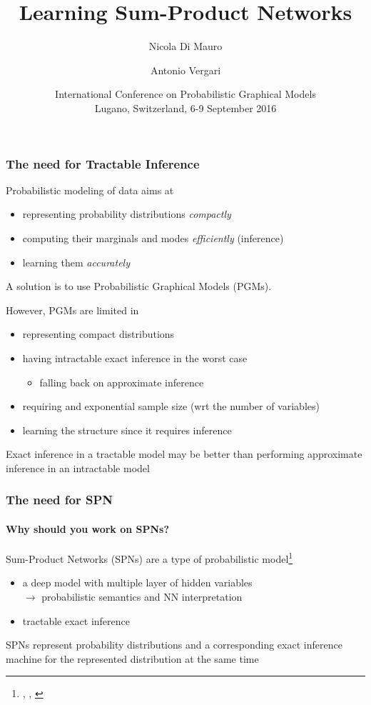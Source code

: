 \documentclass[10pt, t, xcolor={usenames,dvipsnames,svgnames}, compress]{beamer}
\title{Learning Sum-Product Networks}
\author{\small Nicola Di Mauro \and Antonio Vergari}
\date{\scriptsize International Conference on Probabilistic Graphical Models\\
 Lugano, Switzerland, 6-9 September 2016}
\institute{\scriptsize Università degli Studi di Bari}
\newcommand{\customcite}[1]{\footnote{\scriptsize \citeauthor{#1}, \citetitle{#1}, \citeyear{#1}}}
\begin{document}
\begin{frame}[c]
  \titlepage
\end{frame}

\begin{frame}
\frametitle{The need for Tractable Inference}

Probabilistic modeling of data aims at
\begin{itemize}
  \item representing probability distributions \emph{compactly}
  \item computing their marginals and modes \emph{efficiently} (inference)
  \item learning them \emph{accurately}
\end{itemize}
A solution is to use Probabilistic Graphical Models (PGMs).

However, PGMs are limited in
\begin{itemize}
\item representing compact distributions
\item having intractable exact inference in the worst case 
  \begin{itemize}
  \item falling back on approximate inference
  \end{itemize}
\item requiring and exponential sample size (wrt the number of variables)
\item learning the structure since it requires inference
\end{itemize}
Exact inference in a tractable model may be better than performing approximate
inference in an intractable model
\end{frame}

\begin{frame}
\frametitle{The need for SPN }
  \framesubtitle{Why should you work on SPNs?}

Sum-Product Networks (SPNs) are a type of probabilistic model\customcite{Poon2011}
\begin{itemize}
\item a deep model with multiple layer of hidden variables\\ 
  \hfill {\color{violet} $\rightarrow$ probabilistic semantics and NN interpretation}
\item tractable exact inference 
\end{itemize}
SPNs represent probability distributions and a corresponding exact inference
machine for the represented distribution at the same time 
\end{frame}
\end{document}
